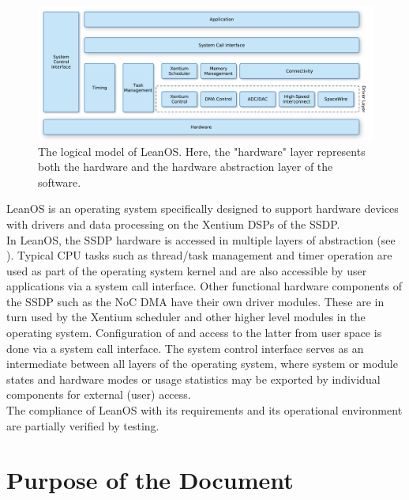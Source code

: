 \begin{figure}[htb]
\begin{center}
	\includegraphics[width=\columnwidth]{../requirements/images/OS_logical}
	\caption{The logical model of LeanOS. Here, the "hardware" layer
	represents both the hardware and the hardware abstraction layer of
	the software.}
	\label{fig:logical_model}
\end{center}
\end{figure}

\noindent
LeanOS is an operating system specifically designed to support hardware devices
with drivers and data processing on the \gls{Xentium} \glspl{DSP} of the
\gls{SSDP}.\\

In LeanOS, the \gls{SSDP} hardware is accessed in multiple layers of
abstraction (see ). Typical \gls{CPU} tasks such as
thread/task management and timer operation are used as part of the operating
system kernel and are also accessible by user applications via a system call
interface.  Other functional hardware components of the \gls{SSDP} such as the
\gls{NoC} \gls{DMA} have their own driver modules. These are in turn used by
the \gls{Xentium} scheduler and other higher level modules in the operating
system.  Configuration of and access to the latter from user space is done via
a system call interface. The system control interface serves as an intermediate
between all layers of the operating system, where system or module states and
hardware modes or usage statistics may be exported by individual components for
external (user) access. \\

\noindent
The compliance of LeanOS with its requirements and its operational environment
are partially verified by testing.


\section{Purpose of the Document}

